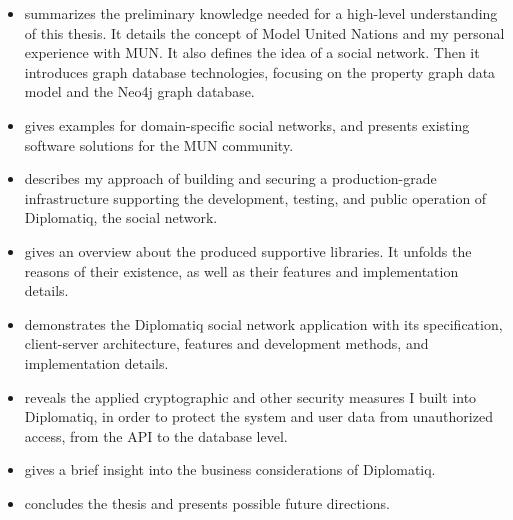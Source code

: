 \begin{itemize}
\item \emph{} summarizes the preliminary knowledge needed for a high-level understanding of this thesis. It details the concept of Model United Nations and my personal experience with MUN. It also defines the idea of a social network. Then it introduces graph database technologies, focusing on the property graph data model and the Neo4j graph database.
\item \emph{} gives examples for domain-specific social networks, and presents existing software solutions for the MUN community.
\item \emph{} describes my approach of building and securing a production-grade infrastructure supporting the development, testing, and public operation of Diplomatiq, the social network.
\item \emph{} gives an overview about the produced supportive libraries. It unfolds the reasons of their existence, as well as their features and implementation details.
\item \emph{} demonstrates the Diplomatiq social network application with its specification, client-server architecture, features and development methods, and implementation details.
\item \emph{} reveals the applied cryptographic and other security measures I built into Diplomatiq, in order to protect the system and user data from unauthorized access, from the API to the database level.
\item \emph{} gives a brief insight into the business considerations of Diplomatiq.
\item \emph{} concludes the thesis and presents possible future directions.
\end{itemize}
